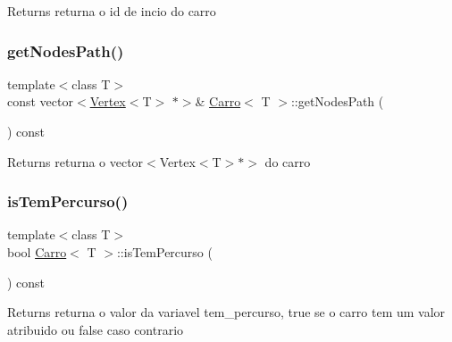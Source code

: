 \begin{DoxyReturn}{Returns}
returna o id de incio do carro 
\end{DoxyReturn}
\mbox{\label{class_carro_a25901ca0dfa975e9b818b76934ec26ad}} 
\subsubsection{\texorpdfstring{get\+Nodes\+Path()}{getNodesPath()}}
{\footnotesize\ttfamily template$<$class T$>$ \\
const vector$<$\mbox{\hyperlink{class_vertex}{Vertex}}$<$T$>$ $\ast$$>$\& \mbox{\hyperlink{class_carro}{Carro}}$<$ T $>$\+::get\+Nodes\+Path (\begin{DoxyParamCaption}{ }\end{DoxyParamCaption}) const\hspace{0.3cm}{\ttfamily [inline]}}

\begin{DoxyReturn}{Returns}
returna o vector$<$Vertex$<$\+T$>$$\ast$$>$ do carro 
\end{DoxyReturn}
\mbox{\label{class_carro_ac73955dd65c1a78d3faa267900b44094}} 
\subsubsection{\texorpdfstring{is\+Tem\+Percurso()}{isTemPercurso()}}
{\footnotesize\ttfamily template$<$class T$>$ \\
bool \mbox{\hyperlink{class_carro}{Carro}}$<$ T $>$\+::is\+Tem\+Percurso (\begin{DoxyParamCaption}{ }\end{DoxyParamCaption}) const\hspace{0.3cm}{\ttfamily [inline]}}

\begin{DoxyReturn}{Returns}
returna o valor da variavel tem\+\_\+percurso, true se o carro tem um valor atribuido ou false caso contrario 
\end{DoxyReturn}
\mbox{\label{class_carro_a56188f8ca0f9d234afffe7217dd815e2}} 
